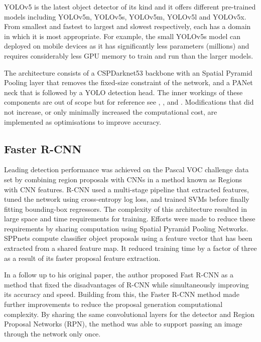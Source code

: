 \documentclass{thesis}
\begin{document}
YOLOv5 is the latest object detector of its kind and it offers different pre-trained models including YOLOv5n, YOLOv5s, YOLOv5m, YOLOv5l and YOLOv5x. From smallest and fastest to largest and slowest respectively, each has a domain in which it is most appropriate. For example, the small YOLOv5s model can deployed on mobile devices as it has significantly less parameters (millions) and requires considerably less GPU memory to train and run than the larger models\cite{yolov5}.

The architecture consists of a CSPDarknet53 backbone with an Spatial Pyramid Pooling layer that removes the fixed-size constraint of the network, and a PANet neck that is followed by a YOLO detection head\cite{yolov1}. The inner workings of these components are out of scope but for reference see \cite{cspnet}, \cite{spp}, \cite{panet} and \cite{yolov5}. Modifications that did not increase, or only minimally increased the computational cost, are implemented as optimisations to improve accuracy\cite{yolov4}.

\subsection{Faster R-CNN}

Leading detection performance was achieved on the Pascal VOC challenge data set by combining region proposals with CNNs in a method known as Regions with CNN features. R-CNN used a multi-stage pipeline that extracted features, tuned the network using cross-entropy log loss, and trained SVMs before finally fitting bounding-box regressors\cite{rcnn}. The complexity of this architecture resulted in large space and time requirements for training. Efforts were made to reduce these requirements by sharing computation using Spatial Pyramid Pooling Networks. SPPnets compute classifier object proposals using a feature vector that has been extracted from a shared feature map. It reduced training time by a factor of three as a result of its faster proposal feature extraction\cite{he2015spatial}.

In a follow up to his original paper, the author proposed Fast R-CNN as a method that fixed the disadvantages of R-CNN while simultaneously improving its accuracy and speed\cite{fast-rcnn}. Building from this, the Faster R-CNN method made further improvements to reduce the proposal generation computational complexity. By sharing the same convolutional layers for the detector and Region Proposal Networks (RPN), the method was able to support passing an image through the network only once\cite{frcnn}.
\end{document}
